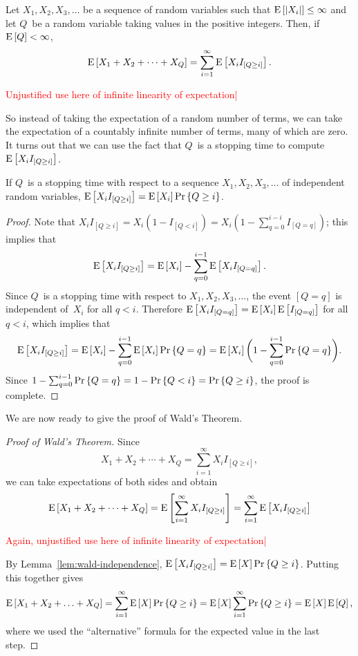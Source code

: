 \documentclass[11pt,twoside]{article}
\begin{document}
\begin{corollary}
  Let $X_1, X_2, X_3, \dots$ be a sequence of random variables such
  that $\mathop{\textup{E}}\nolimits\left[\left|X_i\right|\right] \leq \infty$ and let $Q$~be a random variable
  taking values in the positive integers.  Then, if $\mathop{\textup{E}}\nolimits\left[Q\right] < \infty$,
\[
    \mathop{\textup{E}}\nolimits\left[X_1 + X_2 + \dots + X_Q\right]
    = \sum_{i=1}^{\infty} \mathop{\textup{E}}\nolimits\left[X_i I_{[Q \geq i]}\right].
\]

\begin{editingnotes}
\textcolor{red}{Unjustified use here of infinite linearity of expectation|}
\end{editingnotes}
\end{corollary}

So instead of taking the expectation of a random number of terms, we
can take the expectation of a countably infinite number of terms, many
of which are zero.  It turns out that we can use the fact that $Q$~is a
stopping time to compute $\mathop{\textup{E}}\nolimits\left[X_i I_{[Q \geq i]}\right]$.
\begin{lemma}
  \label{lem:wald-independence}
  If $Q$~is a stopping time with respect to a sequence $X_1, X_2, X_3,
  \dots$ of independent random variables, $\mathop{\textup{E}}\nolimits\left[X_i I_{[Q \geq i]}\right]
  = \mathop{\textup{E}}\nolimits\left[X_i\right] \mathop{\textup{Pr}}\nolimits\left\{Q \geq i\right\}$.
\end{lemma}
\begin{proof}
  Note that $X_i I_{[Q \geq i]} = X_i (1-I_{[Q < i]}) = X_i (1 -
  \sum_{q=0}^{i-i}I_{[Q = q]})$; this implies that
\[
    \mathop{\textup{E}}\nolimits\left[X_i I_{[Q \geq i]}\right] =
    \mathop{\textup{E}}\nolimits\left[X_i\right] - \sum_{q=0}^{i-1} \mathop{\textup{E}}\nolimits\left[X_i I_{[Q = q]}\right].
\]
  Since $Q$~is a stopping time with respect to $X_1, X_2, X_3,
  \dots$, the event $[Q = q]$ is independent of~$X_i$ for all $q <
  i$.  Therefore $\mathop{\textup{E}}\nolimits\left[X_i I_{[Q = q]}\right] = \mathop{\textup{E}}\nolimits\left[X_i\right] \mathop{\textup{E}}\nolimits\left[I_{[Q = q]}\right]$
  for all $q < i$, which implies that
\[
    \mathop{\textup{E}}\nolimits\left[X_i I_{[Q \geq i]}\right] =
    \mathop{\textup{E}}\nolimits\left[X_i\right] - \sum_{q=0}^{i-1} \mathop{\textup{E}}\nolimits\left[X_i\right] \mathop{\textup{Pr}}\nolimits\left\{Q = q\right\} =
    \mathop{\textup{E}}\nolimits\left[X_i\right]\biggl(1 - \sum_{q=0}^{i-1} \mathop{\textup{Pr}}\nolimits\left\{Q = q\right\}\biggr).
\]
  Since $1 - \sum_{q=0}^{i-1} \mathop{\textup{Pr}}\nolimits\left\{Q = q\right\} = 1 - \mathop{\textup{Pr}}\nolimits\left\{Q < i\right\} = \mathop{\textup{Pr}}\nolimits\left\{Q
  \geq i\right\}$, the proof is complete.
\end{proof}
We are now ready to give the proof of Wald's Theorem.
\begin{proof}[Proof of Wald's Theorem]
Since
\[
    X_1 + X_2 + \cdots + X_Q = \sum_{i=1}^{\infty} X_i I_{[Q \geq i]},
\]
we can take expectations of both sides and obtain
\[
\mathop{\textup{E}}\nolimits\left[X_1 + X_2 + \cdots + X_Q\right] = \mathop{\textup{E}}\nolimits\left[\sum_{i=1}^{\infty} X_i I_{[Q \geq i]}\right]
= \sum_{i=1}^{\infty} \mathop{\textup{E}}\nolimits\left[X_i I_{[Q \geq i]}\right]
\]

\begin{editingnotes}
\textcolor{red}{Again, unjustified use here of infinite linearity of expectation|}
\end{editingnotes}
  By Lemma~\ref{lem:wald-independence}, $\mathop{\textup{E}}\nolimits\left[X_i I_{[Q \geq i]}\right] =
  \mathop{\textup{E}}\nolimits\left[X\right] \mathop{\textup{Pr}}\nolimits\left\{Q \geq i\right\}$.  Putting this together gives
\[
\mathop{\textup{E}}\nolimits\left[X_1 + X_2 + \ldots + X_Q\right]
    =  \sum_{i=1}^{\infty} \mathop{\textup{E}}\nolimits\left[X\right] \mathop{\textup{Pr}}\nolimits\left\{Q \geq i\right\}
    =  \mathop{\textup{E}}\nolimits\left[X\right] \sum_{i=1}^{\infty} \mathop{\textup{Pr}}\nolimits\left\{Q \geq i\right\}
    =  \mathop{\textup{E}}\nolimits\left[X\right] \mathop{\textup{E}}\nolimits\left[Q\right],
\]
  where we used the ``alternative'' formula for the expected value in
  the last step.
\end{proof}
\end{document}
